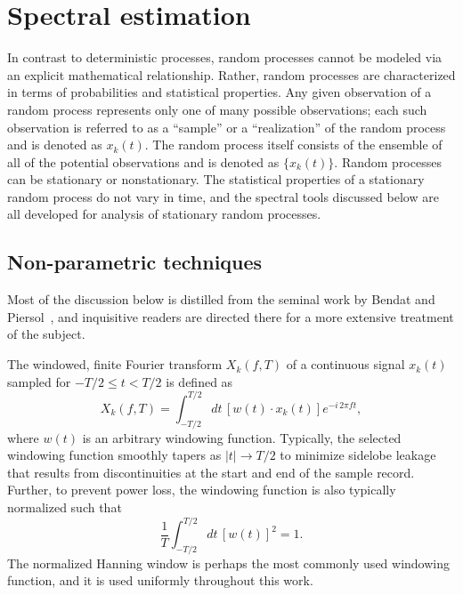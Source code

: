 \chapter{Spectral estimation}
\label{app:SpectralEstimation}
In contrast to deterministic processes,
random processes cannot be modeled via an explicit mathematical relationship.
Rather, random processes are characterized
in terms of probabilities and statistical properties.
Any given observation of a random process represents
only one of many possible observations;
each such observation is referred to as
a ``sample'' or a ``realization'' of the random process
and is denoted as $x_k(t)$.
The random process itself consists of
the ensemble of all of the potential observations
and is denoted as $\{x_k(t)\}$.
Random processes can be stationary or nonstationary.
The statistical properties of a stationary random process
do not vary in time, and
the spectral tools discussed below
are all developed for analysis of stationary random processes.


\section{Non-parametric techniques}
\label{app:SpectralEstimation:NonParametric}
Most of the discussion below is distilled from
the seminal work by Bendat and Piersol~\cite{bendat_and_piersol}, and
inquisitive readers are directed there
for a more extensive treatment of the subject.

The windowed, finite Fourier transform $X_k(f, T)$
of a continuous signal $x_k(t)$
sampled for $-T / 2 \leq t < T / 2$
is defined as
\begin{equation}
  X_k(f, T)
  =
  \int_{-T / 2}^{T / 2}
  dt \, [w(t) \cdot x_k(t)] e^{-i \, 2 \pi f t},
  \label{eq:SpectralEstimation:finite_Fourier_transform}
\end{equation}
where $w(t)$ is an arbitrary windowing function.
Typically, the selected windowing function smoothly tapers
as $|t| \rightarrow T / 2$
to minimize sidelobe leakage
that results from discontinuities at the start and end of the sample record.
Further, to prevent power loss, the windowing function
is also typically normalized such that
\begin{equation}
  \frac{1}{T} \int_{-T/2}^{T/2} dt \, [w(t)]^2 = 1.
\end{equation}
The normalized Hanning window is perhaps
the most commonly used windowing function, and
it is used uniformly throughout this work.

